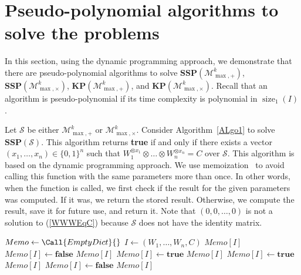 \documentclass[reqno,12pt]{amsart}
\theoremstyle{definition}
\newcommand{\MP}{\mathcal{M}_{\max, {+}}^k}
\newcommand{\MT}{\mathcal{M}_{\max, {\times}}^k}
\newcommand{\SSMPP}{\mathbf{SSP}(\MP)}
\newcommand{\SSMTP}{\mathbf{SSP}(\MT)}
\newcommand{\KMPP}{\mathbf{KP}(\MP)}
\newcommand{\KMTP}{\mathbf{KP}(\MT)}
\DeclareMathOperator{\size}{size}
\DeclareMathOperator{\V}{\mathrm{V}}
\begin{document}
\section{Pseudo-polynomial algorithms to solve the problems}

In this section, using the dynamic programming approach, we demonstrate that there are pseudo-polynomial algorithms to solve $\SSMPP$, $\SSMTP$, $\KMPP$, and $\KMTP$.
Recall that an algorithm is pseudo-polynomial if its time complexity is polynomial in $\size_1(I)$.

Let $\mathcal{S}$ be either $\MP$ or $\MT$.
Consider Algorithm~\ref{ALgo1} to solve $\mathbf{SSP}(\mathcal{S})$. 
This algorithm returns \textbf{true} if and only if there exists a vector $(x_1, \ldots, x_n) \in \{0, 1\}^n$ such that $W_1^{\otimes x_1} \otimes \ldots \otimes  W_n^{\otimes x_n} = C$ over $\mathcal{S}$.
This algorithm is based on the dynamic programming approach. 
We use memoization~\cite{Cormen2022} to avoid calling this function with the same parameters more than once. In other words, when the function is called, we first check if the result for the given parameters was computed. If it was, we return the stored result. Otherwise, we compute the result, save it for future use, and return it.
Note that $(0, 0, \ldots, 0)$ is not a solution to
(\ref{WWWEqC}) because $\mathcal{S}$ does not have the identity matrix.


\begin{algorithm}
    \caption{}\label{ALgo1}
    \begin{algorithmic}[0]
        \State $Memo \gets \Call{EmptyDict}{ }$
            \State $I \gets (W_1, \ldots, W_n, C)$
                \Return $Memo[I]$
            \EndIf
                \State $Memo[I] \gets \textbf{false}$
                \State \Return $Memo[I]$
            \EndIf
                \State $Memo[I] \gets \textbf{true}$
                \State \Return $Memo[I]$   
            \EndIf
            \ForAll {$X \in \V_\mathcal{S}(W_1 \otimes X = C)$}
                    \State $Memo[I] \gets \textbf{true}$
                    \State \Return $Memo[I]$   
                \EndIf
             \EndFor
             \State $Memo[I] \gets \textbf{false}$
             \State \Return $Memo[I]$
        \EndFunction
    \end{algorithmic}
\end{algorithm}
\end{document}
